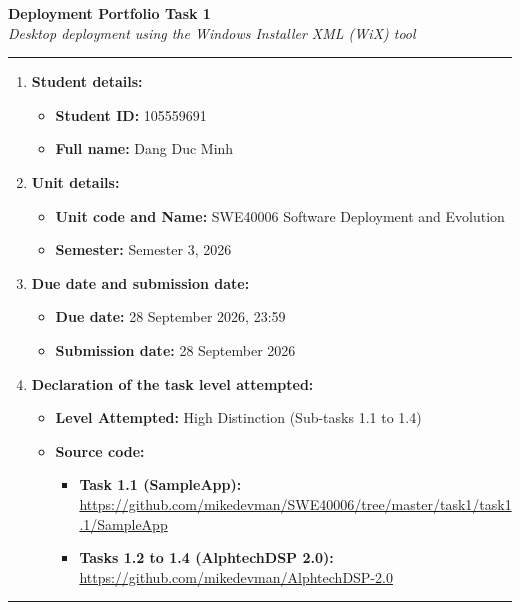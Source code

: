 \documentclass[11pt,a4paper]{article}
\begin{document}
\begin{center}
    {\LARGE \textbf{Deployment Portfolio Task 1}}\\[0.2cm]
    {\large \textit{Desktop deployment using the Windows Installer XML (WiX) tool}}\\[0.1cm]
\end{center}

\noindent\rule{\textwidth}{1pt}\par\vspace{0.2cm}
\begin{enumerate}
    \item \textbf{Student details:}
    \begin{itemize}
        \item \textbf{Student ID:} 105559691
        \item \textbf{Full name:} Dang Duc Minh
    \end{itemize}
    \item \textbf{Unit details:}
    \begin{itemize}
        \item \textbf{Unit code and Name:} SWE40006 Software Deployment and Evolution
        \item \textbf{Semester:} Semester 3, 2026
    \end{itemize}
    \item \textbf{Due date and submission date:}
    \begin{itemize}
        \item \textbf{Due date:} 28 September 2026, 23:59
        \item \textbf{Submission date:} 28 September 2026
    \end{itemize}
    \item \textbf{Declaration of the task level attempted:}
    \begin{itemize}
        \item \textbf{Level Attempted:} High Distinction (Sub-tasks 1.1 to 1.4)
        \item \textbf{Source code:}
        \begin{itemize}
            \item \textbf{Task 1.1 (SampleApp):} \url{https://github.com/mikedevman/SWE40006/tree/master/task1/task1.1/SampleApp}
            \item \textbf{Tasks 1.2 to 1.4 (AlphtechDSP 2.0):} \url{https://github.com/mikedevman/AlphtechDSP-2.0}
        \end{itemize}
    \end{itemize}
\end{enumerate}
\noindent\rule{\textwidth}{1pt}
\end{document}
